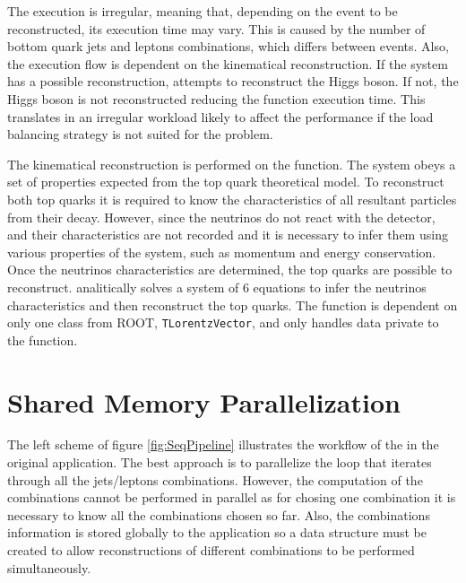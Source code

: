 The \ttDilepKinFit execution is irregular, meaning that, depending on the event to be reconstructed, its execution time may vary. This is caused by the number of bottom quark jets and leptons combinations, which differs between events. Also, the execution flow is dependent on the kinematical reconstruction. If the \ttbar system has a possible reconstruction, \ttDilepKinFit attempts to reconstruct the Higgs boson. If not, the Higgs boson is not reconstructed reducing the function execution time. This translates in an irregular workload likely to affect the performance if the load balancing strategy is not suited for the problem.

The kinematical reconstruction is performed on the \dilep function. The \ttbar system obeys a set of properties expected from the top quark theoretical model. To reconstruct both top quarks it is required to know the characteristics of all resultant particles from their decay. However, since the neutrinos do not react with the detector, and their characteristics are not recorded and it is necessary to infer them using various properties of the system, such as momentum and energy conservation. Once the neutrinos characteristics are determined, the top quarks are possible to reconstruct. \dilep analitically solves a system of 6 equations to infer the neutrinos characteristics and then reconstruct the top quarks. The function is dependent on only one class from ROOT, \texttt{TLorentzVector}, and only handles data private to the function.

\section{Shared Memory Parallelization}
\label{Parallelization:SharedMem}

The left scheme of figure \ref{fig:SeqPipeline} illustrates the workflow of the \ttDilepKinFit in the original \tth application. The best approach is to parallelize the loop that iterates through all the jets/leptons combinations. However, the computation of the combinations cannot be performed in parallel as for chosing one combination it is necessary to know all the combinations chosen so far. Also, the combinations information is stored globally to the application so a data structure must be created to allow reconstructions of different combinations to be performed simultaneously.


